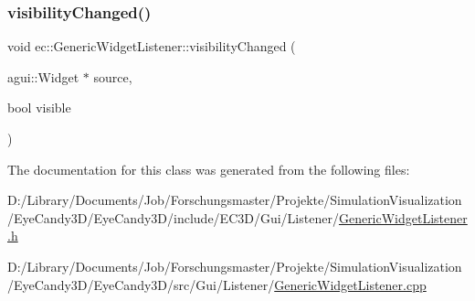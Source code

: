 \mbox{\label{classec_1_1_generic_widget_listener_a6f9e7db28e619ab8c538152972fe6c97}} 
\subsubsection{\texorpdfstring{visibility\+Changed()}{visibilityChanged()}}
{\footnotesize\ttfamily void ec\+::\+Generic\+Widget\+Listener\+::visibility\+Changed (\begin{DoxyParamCaption}\item[{agui\+::\+Widget $\ast$}]{source,  }\item[{bool}]{visible }\end{DoxyParamCaption})\hspace{0.3cm}{\ttfamily [override]}}



The documentation for this class was generated from the following files\+:\begin{DoxyCompactItemize}
\item 
D\+:/\+Library/\+Documents/\+Job/\+Forschungsmaster/\+Projekte/\+Simulation\+Visualization/\+Eye\+Candy3\+D/\+Eye\+Candy3\+D/include/\+E\+C3\+D/\+Gui/\+Listener/\mbox{\hyperlink{_generic_widget_listener_8h}{Generic\+Widget\+Listener.\+h}}\item 
D\+:/\+Library/\+Documents/\+Job/\+Forschungsmaster/\+Projekte/\+Simulation\+Visualization/\+Eye\+Candy3\+D/\+Eye\+Candy3\+D/src/\+Gui/\+Listener/\mbox{\hyperlink{_generic_widget_listener_8cpp}{Generic\+Widget\+Listener.\+cpp}}\end{DoxyCompactItemize}
